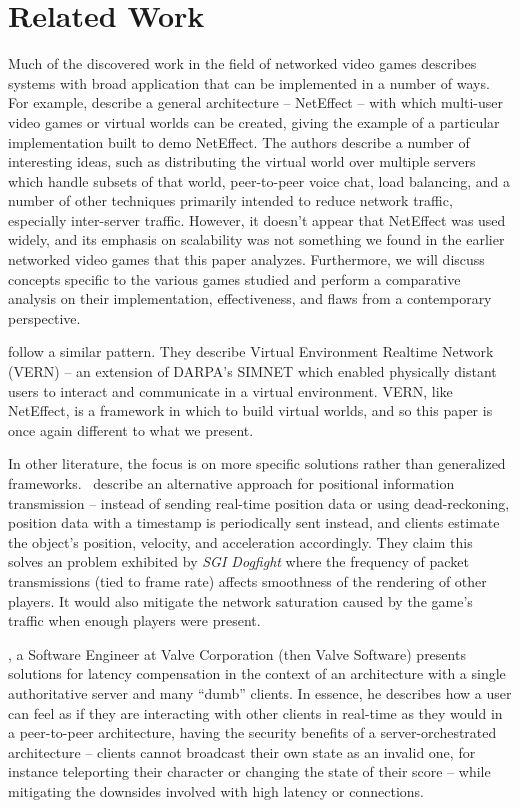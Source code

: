 \section{Related Work}\label{sec:related}

Much of the discovered work in the field of networked video games describes systems with broad application that can be implemented in a number of ways. For example, \citet{Das1997NetEffect} describe a general architecture -- NetEffect -- with which multi-user video games or virtual worlds can be created, giving the example of a particular implementation built to demo NetEffect. The authors describe a number of interesting ideas, such as distributing the virtual world over multiple servers which handle subsets of that world, peer-to-peer voice chat, load balancing, and a number of other techniques primarily intended to reduce network traffic, especially inter-server traffic. However, it doesn't appear that NetEffect was used widely, and its emphasis on scalability was not something we found in the earlier networked video games that this paper analyzes. Furthermore, we will discuss concepts specific to the various games studied and perform a comparative analysis on their implementation, effectiveness, and flaws from a contemporary perspective.

\citet{Blau1992NetworkedEnvironments} follow a similar pattern. They describe Virtual Environment Realtime Network (VERN) -- an extension of DARPA's SIMNET which enabled physically distant users to interact and communicate in a virtual environment. VERN, like NetEffect, is a framework in which to build virtual worlds, and so this paper is once again different to what we present.

In other literature, the focus is on more specific solutions rather than generalized frameworks.~\citet{Singhal1995ExploitingReality} describe an alternative approach for positional information transmission -- instead of sending real-time position data or using dead-reckoning, position data with a timestamp is periodically sent instead, and clients estimate the object's position, velocity, and acceleration accordingly. They claim this solves an problem exhibited by \textit{SGI Dogfight} where the frequency of packet transmissions (tied to frame rate) affects smoothness of the rendering of other players. It would also mitigate the network saturation caused by the game's traffic when enough players were present.

\citet{YahnW.Bernier2003LatencyOptimization}, a Software Engineer at Valve Corporation (then Valve Software) presents solutions for latency compensation in the context of an architecture with a single authoritative server and many ``dumb'' clients. In essence, he describes how a user can feel as if they are interacting with other clients in real-time as they would in a peer-to-peer architecture, having the security benefits of a server-orchestrated architecture -- clients cannot broadcast their own state as an invalid one, for instance teleporting their character or changing the state of their score -- while mitigating the downsides involved with high latency or connections.

